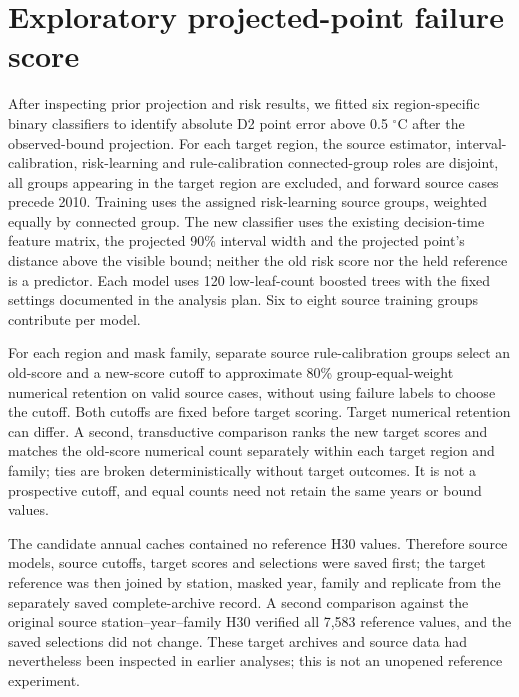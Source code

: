 \section{Exploratory projected-point failure score}
After inspecting prior projection and risk results, we fitted six region-specific binary classifiers to identify absolute D2 point error above 0.5 $^{\circ}$C after the observed-bound projection. For each target region, the source estimator, interval-calibration, risk-learning and rule-calibration connected-group roles are disjoint, all groups appearing in the target region are excluded, and forward source cases precede 2010. Training uses the assigned risk-learning source groups, weighted equally by connected group. The new classifier uses the existing decision-time feature matrix, the projected 90\% interval width and the projected point's distance above the visible bound; neither the old risk score nor the held reference is a predictor. Each model uses 120 low-leaf-count boosted trees with the fixed settings documented in the analysis plan. Six to eight source training groups contribute per model.

For each region and mask family, separate source rule-calibration groups select an old-score and a new-score cutoff to approximate 80\% group-equal-weight numerical retention on valid source cases, without using failure labels to choose the cutoff. Both cutoffs are fixed before target scoring. Target numerical retention can differ. A second, transductive comparison ranks the new target scores and matches the old-score numerical count separately within each target region and family; ties are broken deterministically without target outcomes. It is not a prospective cutoff, and equal counts need not retain the same years or bound values.

The candidate annual caches contained no reference H30 values. Therefore source models, source cutoffs, target scores and selections were saved first; the target reference was then joined by station, masked year, family and replicate from the separately saved complete-archive record. A second comparison against the original source station--year--family H30 verified all 7,583 reference values, and the saved selections did not change. These target archives and source data had nevertheless been inspected in earlier analyses; this is not an unopened reference experiment.

